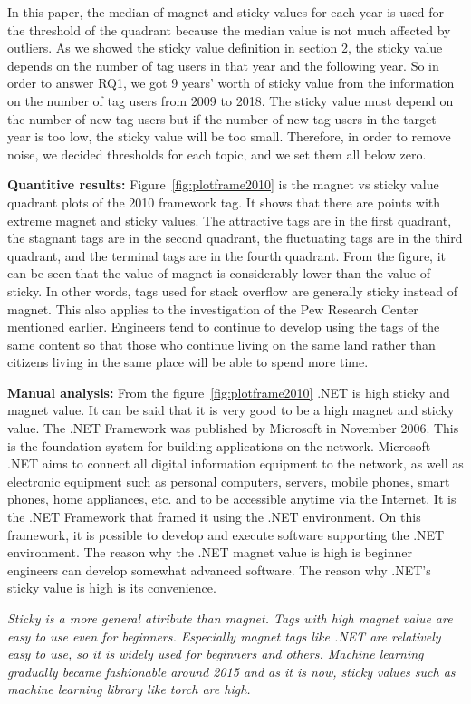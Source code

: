 \documentclass[conference]{IEEEtran}
\begin{document}
In this paper, the median of magnet and sticky values for each year is used for the threshold of the quadrant because the median value is not much affected by outliers. As we showed the sticky value definition in section 2, the sticky value depends on the number of tag users in that year and the following year. So in order to answer RQ1, we got 9 years' worth of sticky value from the information on the number of tag users from 2009 to 2018. The sticky value must depend on the number of new tag users but if the number of new tag users in the target year is too low, the sticky value will be too small. Therefore, in order to remove noise, we decided thresholds for each topic, and we set them all below zero. 
\medskip


\textbf{Quantitive results:}
Figure~\ref{fig:plotframe2010} is the magnet vs sticky value quadrant plots of the 2010 framework tag. It shows that there are points with extreme magnet and sticky values. The attractive tags are in the first quadrant, the stagnant tags are in the second quadrant, the fluctuating tags are in the third quadrant, and the terminal tags are in the fourth quadrant. From the figure, it can be seen that the value of magnet is considerably lower than the value of sticky. In other words, tags used for stack overflow are generally sticky instead of magnet. This also applies to the investigation of the Pew Research Center mentioned earlier. Engineers tend to continue to develop using the tags of the same content so that those who continue living on the same land rather than citizens living in the same place will be able to spend more time. 
\smallskip
\smallskip

\textbf{Manual analysis:}
From the figure~\ref{fig:plotframe2010} .NET is high sticky and magnet value. It can be said that it is very good to be a high magnet and sticky value. The .NET Framework was published by Microsoft in November 2006. This is the foundation system for building applications on the network.  Microsoft .NET aims to connect all digital information equipment to the network, as well as electronic equipment such as personal computers, servers, mobile phones, smart phones, home appliances, etc. and to be accessible anytime via the Internet. It is the .NET Framework that framed it using the .NET environment. On this framework, it is possible to develop and execute software supporting the .NET environment. The reason why the .NET magnet value is high is beginner engineers can develop somewhat advanced software. The reason why .NET's sticky value is high is its convenience.
\medskip
 
\begin{oframed}
 \emph{Sticky is a more general attribute than magnet. Tags with high magnet value are easy to use even for beginners. Especially magnet tags like .NET are relatively easy to use, so it is widely used for beginners and others. Machine learning gradually became fashionable around 2015 and as it is now, sticky values such as machine learning library like torch are high.}
\end{oframed}
\medskip
\end{document}
